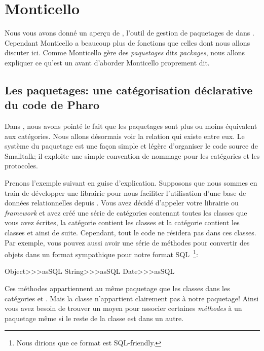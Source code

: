 \documentclass[a4paper,10pt,twoside]{book}
\begin{document}
\section{Monticello}

Nous vous avons donné un aperçu de , l'outil de gestion
de paquetages de \pharo dans .  
Cependant Monticello a beaucoup plus de fonctions que celles dont nous allons
discuter ici.
Comme Monticello gère des \emph{paquetages} dits \emph{packages}, nous allons expliquer ce qu'est
un  avant d'aborder Monticello proprement dit.

\subsection{Les paquetages: une catégorisation déclarative du code de Pharo}

Dans , nous avons pointé le fait
que les paquetages sont plus ou moins équivalent aux catégories. 
Nous allons désormais voir la relation qui existe entre eux.
Le système du paquetage est une façon simple et légère
d'organiser le code source de Smalltalk; il exploite une simple
convention de nommage pour les catégories et les protocoles.

Prenons l'exemple suivant en guise d'explication.
Supposons que nous sommes en train de développer une librairie pour
nous faciliter l'utilisation d'une base de données relationnelles depuis
\pharo. Vous avez décidé d'appeler votre librairie ou \emph{framework}
 et avez créé une série de catégories
contenant toutes les classes que vous avez écrites, \eg la catégorie
 contient les classes
 et la catégorie
 contient les classes
et ainsi de suite. Cependant, tout le code ne résidera pas dans ces classes.
Par exemple, vous pouvez aussi avoir une série de méthodes pour 
convertir des objets dans un format sympathique pour notre format
SQL~\footnote{Nous dirions que ce format est SQL-friendly.}:

\begin{code}{}
Object>>>asSQL
String>>>asSQL
Date>>>asSQL
\end{code}

\noindent
Ces méthodes appartiennent au même paquetage que les classes
dans les catégories  et .
Mais la classe  n'appartient clairement pas à notre paquetage!
Ainsi vous avez besoin de trouver un moyen pour associer certaines
\emph{méthodes} à un paquetage même si le reste de la classe est dans
un autre. 
\end{document}
